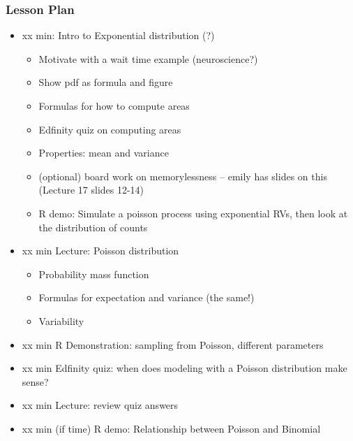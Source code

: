 \begin{frame}
    \frametitle{Lesson Plan}
    \begin{itemize}
        \item xx min: Intro to Exponential distribution (?)
        \begin{itemize}
            \item Motivate with a wait time example (neuroscience?)
            \item Show pdf as formula and figure
            \item Formulas for how to compute areas
            \item Edfinity quiz on computing areas
            \item Properties: mean and variance
            \item (optional) board work on memorylessness -- emily has slides on this (Lecture 17 slides 12-14)
            \item R demo: Simulate a poisson process using exponential RVs, then look at the distribution of counts
        \end{itemize}
        \item xx min Lecture: Poisson distribution
        \begin{itemize}
            \item Probability mass function
            \item Formulas for expectation and variance (the same!)
            \item Variability
        \end{itemize}
        \item xx min R Demonstration: sampling from Poisson, different parameters
        \item xx min Edfinity quiz: when does modeling with a Poisson distribution make sense?
        \item xx min Lecture: review quiz answers
        \item xx min (if time) R demo: Relationship between Poisson and Binomial
    \end{itemize}
\end{frame}
    


